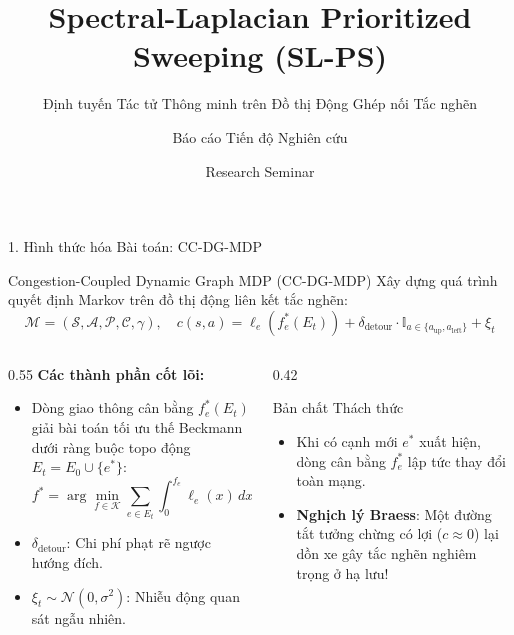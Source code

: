 \documentclass[aspectratio=169, 10pt]{beamer}
\title[SL-PS: Spectral-Laplacian Prioritized Sweeping]{Spectral-Laplacian Prioritized Sweeping (SL-PS)}
\subtitle{Định tuyến Tác tử Thông minh trên Đồ thị Động Ghép nối Tắc nghẽn}
\author[Author Team]{Báo cáo Tiến độ Nghiên cứu}
\institute[Laboratory]{Department of Computer Science \& Artificial Intelligence}
\date[\today]{Research Seminar}
\begin{document}
\begin{frame}[plain]
    \titlepage
\end{frame}

\begin{frame}{1. Hình thức hóa Bài toán: CC-DG-MDP}
    \begin{block}{Congestion-Coupled Dynamic Graph MDP (CC-DG-MDP)}
        Xây dựng quá trình quyết định Markov trên đồ thị động liên kết tắc nghẽn:
        \[
            \mathcal{M} = (\mathcal{S}, \mathcal{A}, \mathcal{P}, \mathcal{C}, \gamma), \quad 
            c(s, a) = \ell_e(f_e^*(E_t)) + \delta_{\text{detour}} \cdot \mathbb{I}_{a \in \{a_{\text{up}}, a_{\text{left}}\}} + \xi_t
        \]
    \end{block}
    
    \vspace{0.2cm}
    \begin{columns}[T]
        \begin{column}{0.55\textwidth}
            \textbf{Các thành phần cốt lõi:}
            \begin{itemize}
                \item Dòng giao thông cân bằng $f_e^*(E_t)$ giải bài toán tối ưu thế Beckmann dưới ràng buộc topo động $E_t = E_0 \cup \{e^*\}$:
                \[
                    f^* = \arg\min_{f \in \mathcal{K}} \sum_{e \in E_t} \int_0^{f_e} \ell_e(x) \, dx
                \]
                \item $\delta_{\text{detour}}$: Chi phí phạt rẽ ngược hướng đích.
                \item $\xi_t \sim \mathcal{N}(0, \sigma^2)$: Nhiễu động quan sát ngẫu nhiên.
            \end{itemize}
        \end{column}
        
        \begin{column}{0.42\textwidth}
            \begin{alertblock}{Bản chất Thách thức}
                \begin{itemize}
                    \item Khi có cạnh mới $e^*$ xuất hiện, dòng cân bằng $f_e^*$ lập tức thay đổi toàn mạng.
                    \item \textbf{Nghịch lý Braess}: Một đường tắt tưởng chừng có lợi ($c \approx 0$) lại dồn xe gây tắc nghẽn nghiêm trọng ở hạ lưu!
                \end{itemize}
            \end{alertblock}
        \end{column}
    \end{columns}
\end{frame}
\end{document}
